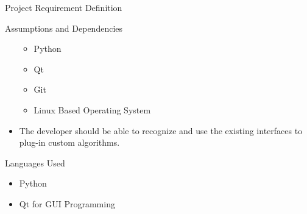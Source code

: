 \documentclass{report}
\begin{document}
\begin{projChapter}{Project Requirement Definition}
\begin{projSection}{Assumptions and Dependencies}
\begin{itemize}
\begin{itemize}
  \item Python
  \item Qt
  \item Git
  \item Linux Based Operating System
\end{itemize}


  \item The developer should be able to recognize and use the existing interfaces to plug-in custom algorithms.
\end{itemize}

\end{projSection}
\begin{projSection}{Languages Used}

\begin{itemize}
  \item Python
  \item Qt for GUI Programming
\end{itemize}

\end{projSection}
\end{projChapter}
\end{document}
